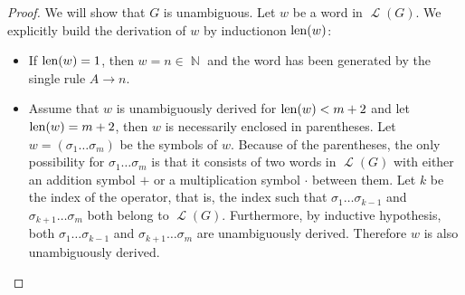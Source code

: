 \begin{proof}
  We will show that \( G \) is unambiguous. Let \( w \) be a word in \( \mscrL(G) \). We explicitly build the derivation of \( w \) by induction\IND on \( \operatorname{len}(w) \):
  \begin{itemize}
    \item If \( \operatorname{len}(w) = 1 \), then \( w = n \in \BbbN \) and the word has been generated by the single rule \( A \to n \).

    \item Assume that \( w \) is unambiguously derived for \( \operatorname{len}(w) < m + 2 \) and let \( \operatorname{len}(w) = m + 2 \), then \( w \) is necessarily enclosed in parentheses. Let \( w = ( \sigma_1 \ldots \sigma_m ) \) be the symbols of \( w \). Because of the parentheses, the only possibility for \( \sigma_1 \ldots \sigma_m \) is that it consists of two words in \( \mscrL(G) \) with either an addition symbol \( + \) or a multiplication symbol \( \cdot \) between them. Let \( k \) be the index of the operator, that is, the index such that \( \sigma_1 \ldots \sigma_{k-1} \) and \( \sigma_{k+1} \ldots \sigma_m \) both belong to \( \mscrL(G) \). Furthermore, by inductive hypothesis, both \( \sigma_1 \ldots \sigma_{k-1} \) and \( \sigma_{k+1} \ldots \sigma_m \) are unambiguously derived. Therefore \( w \) is also unambiguously derived.
  \end{itemize}
\end{proof}
